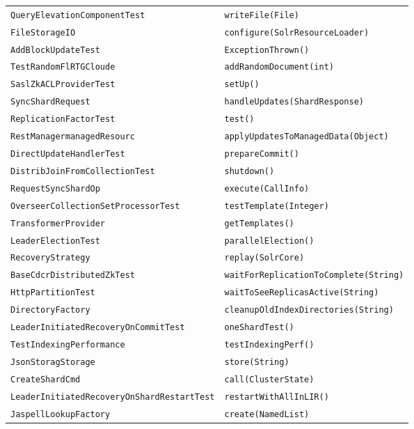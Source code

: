 \begin{center}
\begin{longtable}{ll}
\lstinline/QueryElevationComponentTest/&{\lstinline/writeFile(File)/}\\
\lstinline/FileStorageIO/&{\lstinline/configure(SolrResourceLoader)/}\\
\lstinline/AddBlockUpdateTest/&{\lstinline/ExceptionThrown()/}\\
\lstinline/TestRandomFlRTGCloude/&{\lstinline/addRandomDocument(int)/}\\
\lstinline/SaslZkACLProviderTest/&{\lstinline/setUp()/}\\
\lstinline/SyncShardRequest/&{\lstinline/handleUpdates(ShardResponse)/}\\
\lstinline/ReplicationFactorTest/&{\lstinline/test()/}\\
\lstinline/RestManagermanagedResourc/&{\lstinline/applyUpdatesToManagedData(Object)/}\\
\lstinline/DirectUpdateHandlerTest/&{\lstinline/prepareCommit()/}\\
\lstinline/DistribJoinFromCollectionTest/&{\lstinline/shutdown()/}\\
\lstinline/RequestSyncShardOp/&{\lstinline/execute(CallInfo)/}\\
\lstinline/OverseerCollectionSetProcessorTest/&{\lstinline/testTemplate(Integer)/}\\
\lstinline/TransformerProvider/&{\lstinline/getTemplates()/}\\
\lstinline/LeaderElectionTest/&{\lstinline/parallelElection()/}\\
\lstinline/RecoveryStrategy/&{\lstinline/replay(SolrCore)/}\\
\lstinline/BaseCdcrDistributedZkTest/&{\lstinline/waitForReplicationToComplete(String)/}\\
\lstinline/HttpPartitionTest/&{\lstinline/waitToSeeReplicasActive(String)/}\\
\lstinline/DirectoryFactory/&{\lstinline/cleanupOldIndexDirectories(String)/}\\
\lstinline/LeaderInitiatedRecoveryOnCommitTest/&{\lstinline/oneShardTest()/}\\
\lstinline/TestIndexingPerformance/&{\lstinline/testIndexingPerf()/}\\
\lstinline/JsonStoragStorage/&{\lstinline/store(String)/}\\
\lstinline/CreateShardCmd/&{\lstinline/call(ClusterState)/}\\
\lstinline/LeaderInitiatedRecoveryOnShardRestartTest/&{\lstinline/restartWithAllInLIR()/}\\
\lstinline/JaspellLookupFactory/&{\lstinline/create(NamedList)/}\\

\end{longtable}
\end{center}
